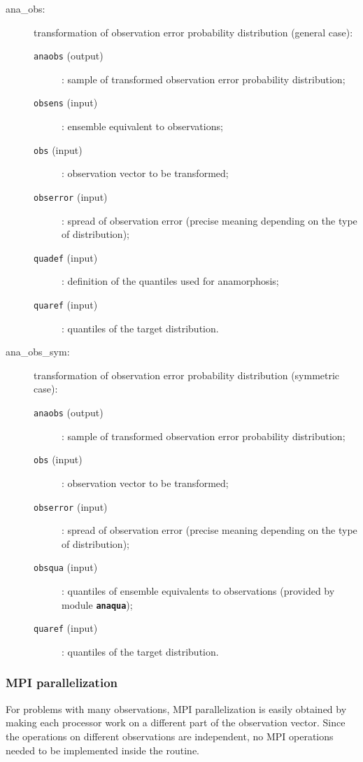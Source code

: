 \documentclass[11pt]{article}
\begin{document}
\begin{description}
\item[ana\_obs:] transformation of observation error probability distribution (general case):
  \begin{description}
  \item[{\tt anaobs} (output)]: sample of transformed observation error probability distribution;
  \item[{\tt obsens} (input)]: ensemble equivalent to observations;
  \item[{\tt obs} (input)]: observation vector to be transformed;
  \item[{\tt obserror} (input)]: spread of observation error (precise meaning depending on the type of distribution);
  \item[{\tt quadef} (input)]: definition of the quantiles used for anamorphosis;
  \item[{\tt quaref} (input)]: quantiles of the target distribution.
  \end{description}
\item[ana\_obs\_sym:] transformation of observation error probability distribution (symmetric case):
  \begin{description}
  \item[{\tt anaobs} (output)]: sample of transformed observation error probability distribution;
  \item[{\tt obs} (input)]: observation vector to be transformed;
  \item[{\tt obserror} (input)]: spread of observation error (precise meaning depending on the type of distribution);
  \item[{\tt obsqua} (input)]: quantiles of ensemble equivalents to observations (provided by module {\tt\bf anaqua});
  \item[{\tt quaref} (input)]: quantiles of the target distribution.
  \end{description}
\end{description}

\subsubsection*{MPI parallelization}

For problems with many observations,
MPI parallelization is easily obtained by making each processor
work on a different part of the observation vector.
Since the operations on different observations are independent,
no MPI operations needed to be implemented inside the routine.
\end{document}
